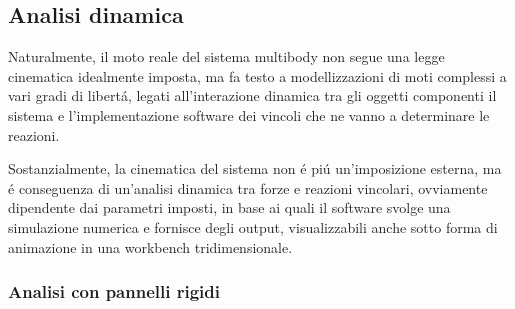 \documentclass{article}
\begin{document}
        \subsection{Analisi dinamica\label{analisi_dinamica}}

        Naturalmente, il moto reale del sistema multibody non segue una legge cinematica idealmente
        imposta, ma fa testo a modellizzazioni di moti complessi a vari gradi di libertá, legati all'interazione
        dinamica tra gli oggetti componenti il sistema e l'implementazione software dei vincoli che ne vanno a 
        determinare le reazioni. 

        Sostanzialmente, la cinematica del sistema non é piú un'imposizione esterna, ma 
        é conseguenza di un'analisi dinamica tra forze e reazioni vincolari, ovviamente
        dipendente dai parametri imposti, in base ai quali il software svolge una simulazione
        numerica e fornisce degli output, visualizzabili anche sotto forma di animazione in una
        workbench tridimensionale. 

        \subsubsection{Analisi con pannelli rigidi\label{analisi_pannelli_rigidi}}
\end{document}
